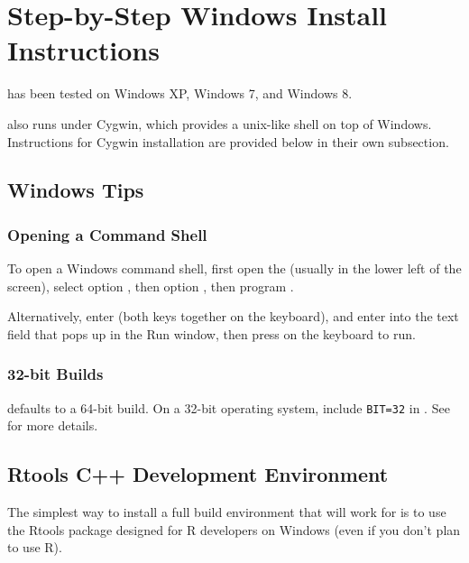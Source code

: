 \section{Step-by-Step Windows Install Instructions}\label{install-windows.appendix}

\CmdStan has been tested on Windows XP, Windows 7, and Windows 8.

\CmdStan also runs under Cygwin, which provides a unix-like shell on top
of Windows.  Instructions for Cygwin installation are provided below
in their own subsection.


\subsection{Windows Tips}


\subsubsection{Opening a Command Shell}

To open a Windows command shell, first open the 
(usually in the lower left of the screen), select option
, then option , then
program .

Alternatively, enter \code{[Windows+r]} (both keys together on the
keyboard), and enter  into the text field that pops up in
the Run window, then press \code{[Return]} on the keyboard to run.

\subsubsection{32-bit Builds}

\CmdStan defaults to a 64-bit build. On a 32-bit operating system,
include \verb|BIT=32| in . See
 for more details.

\subsection{Rtools C++ Development Environment}

The simplest way to install a full \Cpp build environment that will
work for \CmdStan is to use the Rtools package designed for R
developers on Windows (even if you don't plan to use R).

